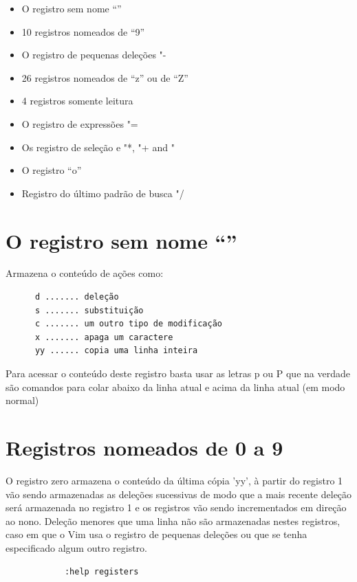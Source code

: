 \documentclass[10pt,a4paper,openany]{book}
\begin{document}
\begin{itemize}
	\item O registro sem nome ``''
	\item 10 registros nomeados de ``9''
	\item O registro de pequenas deleções "-
	\item 26 registros nomeados de ``z'' ou de ``Z''
	\item 4 registros somente leitura
	\item O registro de expressões "=
	\item Os registro de seleção e  "*, "+ and "~
	\item O registro ``o''
	\item Registro do último padrão de busca "/
\end{itemize}

\section{O registro sem nome ``''}
\label{O registro sem nome ``''}

Armazena o conteúdo de ações como:

\begin{verbatim}
	  d ....... deleção
	  s ....... substituição
	  c ....... um outro tipo de modificação
	  x ....... apaga um caractere
	  yy ...... copia uma linha inteira
\end{verbatim}

Para acessar o conteúdo deste registro basta usar as letras p ou P que
na verdade são comandos para colar abaixo da linha atual e acima da
linha atual (em modo normal)

\section{Registros nomeados de 0 a 9}
\label{Registros nomeados de 0 a 9}

O registro zero armazena o conteúdo da última cópia 'yy', à partir do
registro 1 vão sendo armazenadas as deleções sucessivas de modo que a
mais recente deleção será armazenada no registro 1 e os registros vão
sendo incrementados em direção ao nono.  Deleção menores que uma linha
não são armazenadas nestes registros, caso em que o Vim usa o registro
de pequenas deleções ou que se tenha especificado algum outro
registro.

\begin{verbatim}
			:help registers
\end{verbatim}
\end{document}
